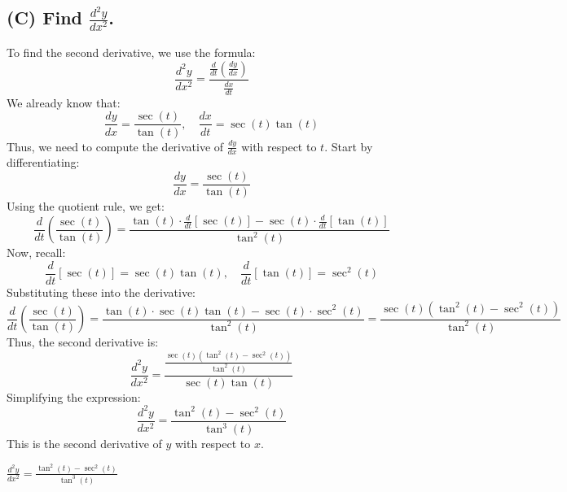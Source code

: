 \documentclass{article}
\begin{document}
\subsection*{(C) Find \( \frac{d^2y}{dx^2} \).}

\begin{solutionbox}
To find the second derivative, we use the formula:
\[
    \frac{d^2y}{dx^2} = \frac{\frac{d}{dt}\left( \frac{dy}{dx} \right)}{\frac{dx}{dt}}
\]
We already know that:
\[
    \frac{dy}{dx} = \frac{\sec(t)}{\tan(t)}, \quad \frac{dx}{dt} = \sec(t)\tan(t)
\]
Thus, we need to compute the derivative of \( \frac{dy}{dx} \) with respect to \( t \). Start by differentiating:
\[
    \frac{dy}{dx} = \frac{\sec(t)}{\tan(t)}
\]
Using the quotient rule, we get:
\[
    \frac{d}{dt} \left( \frac{\sec(t)}{\tan(t)} \right) = \frac{\tan(t) \cdot \frac{d}{dt}[\sec(t)] - \sec(t) \cdot \frac{d}{dt}[\tan(t)]}{\tan^2(t)}
\]
Now, recall:
\[
    \frac{d}{dt}[\sec(t)] = \sec(t) \tan(t), \quad \frac{d}{dt}[\tan(t)] = \sec^2(t)
\]
Substituting these into the derivative:
\[
    \frac{d}{dt} \left( \frac{\sec(t)}{\tan(t)} \right) = \frac{\tan(t) \cdot \sec(t) \tan(t) - \sec(t) \cdot \sec^2(t)}{\tan^2(t)} = \frac{\sec(t) (\tan^2(t) - \sec^2(t))}{\tan^2(t)}
\]
Thus, the second derivative is:
\[
    \frac{d^2y}{dx^2} = \frac{\frac{\sec(t) (\tan^2(t) - \sec^2(t))}{\tan^2(t)}}{\sec(t)\tan(t)}
\]
Simplifying the expression:
\[
    \frac{d^2y}{dx^2} = \frac{\tan^2(t) - \sec^2(t)}{\tan^3(t)}
\]
This is the second derivative of \( y \) with respect to \( x \).
\begin{answerbox}
\LARGE
\( \frac{d^2y}{dx^2} = \frac{\tan^2(t) - \sec^2(t)}{\tan^3(t)} \)
\normalsize
\end{answerbox}
\end{solutionbox}
\end{document}
